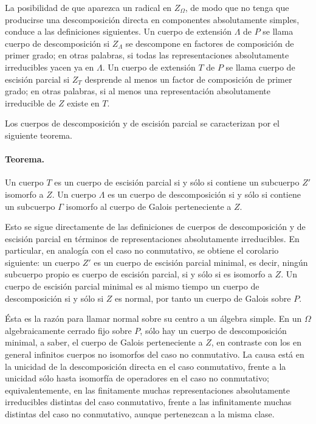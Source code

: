 La posibilidad de que aparezca un radical en \(Z_\Omega\), de modo que no tenga que producirse una descomposición directa en componentes absolutamente simples, conduce a las definiciones siguientes. Un cuerpo de extensión \(\Lambda\) de \(P\) se llama cuerpo de descomposición si \(Z_\Lambda\) se descompone en factores de composición de primer grado; en otras palabras, si todas las representaciones absolutamente irreducibles yacen ya en \(\Lambda\). Un cuerpo de extensión \(T\) de \(P\) se llama cuerpo de escisión parcial si \(Z_T\) desprende al menos un factor de composición de primer grado; en otras palabras, si al menos una representación absolutamente irreducible de \(Z\) existe en \(T\).

Los cuerpos de descomposición y de escisión parcial se caracterizan por el siguiente teorema.

\paragraph{Teorema.}
Un cuerpo \(T\) es un cuerpo de escisión parcial si y sólo si contiene un subcuerpo \(Z'\) isomorfo a \(Z\). Un cuerpo \(\Lambda\) es un cuerpo de descomposición si y sólo si contiene un subcuerpo \(\Gamma\) isomorfo al cuerpo de Galois perteneciente a \(Z\).

Esto se sigue directamente de las definiciones de cuerpos de descomposición y de escisión parcial en términos de representaciones absolutamente irreducibles. En particular, en analogía con el caso no conmutativo, se obtiene el corolario siguiente: un cuerpo \(Z'\) es un cuerpo de escisión parcial minimal, es decir, ningún subcuerpo propio es cuerpo de escisión parcial, si y sólo si es isomorfo a \(Z\). Un cuerpo de escisión parcial minimal es al mismo tiempo un cuerpo de descomposición si y sólo si \(Z\) es normal, por tanto un cuerpo de Galois sobre \(P\).

Ésta es la razón para llamar normal sobre su centro a un álgebra simple. En un \(\Omega\) algebraicamente cerrado fijo sobre \(P\), sólo hay un cuerpo de descomposición minimal, a saber, el cuerpo de Galois perteneciente a \(Z\), en contraste con los en general infinitos cuerpos no isomorfos del caso no conmutativo. La causa está en la unicidad de la descomposición directa en el caso conmutativo, frente a la unicidad sólo hasta isomorfía de operadores en el caso no conmutativo; equivalentemente, en las finitamente muchas representaciones absolutamente irreducibles distintas del caso conmutativo, frente a las infinitamente muchas distintas del caso no conmutativo, aunque pertenezcan a la misma clase.

